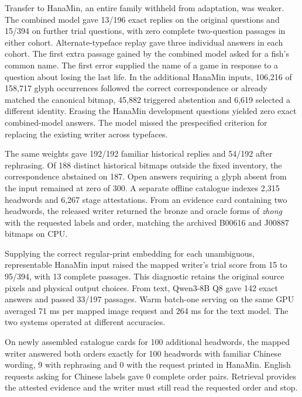 \documentclass[12pt,a4paper]{article}
\providecommand{\DIFadd}[1]{{\protect\color{blue} \sf #1}} %
\begin{document}
\DIFadd{Transfer to HanaMin, an entire family withheld from adaptation, was weaker. The combined model gave 13/196 exact replies on the original questions and 15/394 on further trial questions, with zero complete two-question passages in either cohort. Alternate-typeface replay gave three individual answers in each cohort. The first extra passage gained by the combined model asked for a fish's common name. The first error supplied the name of a game in response to a question about losing the last life. In the additional HanaMin inputs, 106,216 of 158,717 glyph occurrences followed the correct correspondence or already matched the canonical bitmap, 45,882 triggered abstention and 6,619 selected a different identity. Erasing the HanaMin development questions yielded zero exact combined-model answers. The model missed the prespecified criterion for replacing the existing writer across typefaces.
}

\DIFadd{The same weights gave 192/192 familiar historical replies and 54/192 after rephrasing. Of 188 distinct historical bitmaps outside the fixed inventory, the correspondence abstained on 187. Open answers requiring a glyph absent from the input remained at zero of 300. A separate offline catalogue indexes 2,315 headwords and 6,267 stage attestations. From an evidence card containing two headwords, the released writer returned the bronze and oracle forms of \textit{zhong} with the requested labels and order, matching the archived B00616 and J00887 bitmaps on CPU.
}

\DIFadd{Supplying the correct regular-print embedding for each unambiguous, representable HanaMin input raised the mapped writer's trial score from 15 to 95/394, with 13 complete passages. This diagnostic retains the original source pixels and physical output choices. From text, Qwen3-8B Q8 gave 142 exact answers and passed 33/197 passages. Warm batch-one serving on the same GPU averaged 71 ms per mapped image request and 264 ms for the text model. The two systems operated at different accuracies.
}

\DIFadd{On newly assembled catalogue cards for 100 additional headwords, the mapped writer answered both orders exactly for 100 headwords with familiar Chinese wording, 9 with rephrasing and 0 with the request printed in HanaMin. English requests asking for Chinese labels gave 0 complete order pairs. Retrieval provides the attested evidence and the writer must still read the requested order and stop.
}
\end{document}
